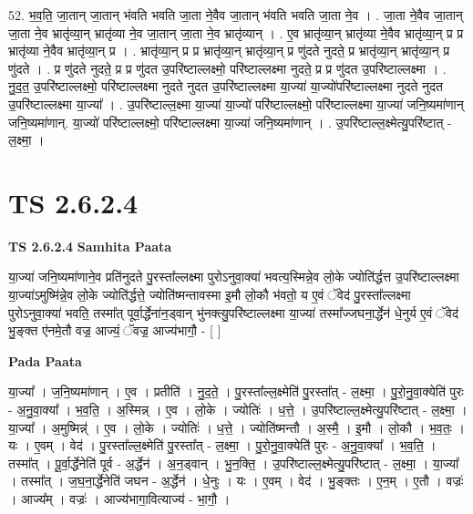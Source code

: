 \documentclass[17pt]{extarticle}
\begin{document}
52. भ॒व॒ति॒ जा॒तान् जा॒तान् भ॑वति भवति जा॒ता ने॒वैव जा॒तान् भ॑वति भवति जा॒ता ने॒व । . जा॒ता ने॒वैव जा॒तान् जा॒ता ने॒व भ्रातृ॑व्या॒न् भ्रातृ॑व्या ने॒व जा॒तान् जा॒ता ने॒व भ्रातृ॑व्यान् । . ए॒व भ्रातृ॑व्या॒न् भ्रातृ॑व्या ने॒वैव भ्रातृ॑व्या॒न् प्र प्र भ्रातृ॑व्या ने॒वैव भ्रातृ॑व्या॒न् प्र । . भ्रातृ॑व्या॒न् प्र प्र भ्रातृ॑व्या॒न् भ्रातृ॑व्या॒न् प्र णु॑दते नुदते॒ प्र भ्रातृ॑व्या॒न् भ्रातृ॑व्या॒न् प्र णु॑दते । . प्र णु॑दते नुदते॒ प्र प्र णु॑दत उ॒परि॑ष्टाल्लक्ष्मो॒ परि॑ष्टाल्लक्ष्मा नुदते॒ प्र प्र णु॑दत उ॒परि॑ष्टाल्लक्ष्मा । . नु॒द॒त॒ उ॒परि॑ष्टाल्लक्ष्मो॒ परि॑ष्टाल्लक्ष्मा नुदते नुदत उ॒परि॑ष्टाल्लक्ष्मा या॒ज्या॑ या॒ज्यो॑परि॑ष्टाल्लक्ष्मा नुदते नुदत उ॒परि॑ष्टाल्लक्ष्मा या॒ज्या᳚ । . उ॒परि॑ष्टाल्ल॒क्ष्मा या॒ज्या॑ या॒ज्यो॑ परि॑ष्टाल्लक्ष्मो॒ परि॑ष्टाल्लक्ष्मा या॒ज्या॑ जनि॒ष्यमा॑णान् जनि॒ष्यमा॑णान्. या॒ज्यो॑ परि॑ष्टाल्लक्ष्मो॒ परि॑ष्टाल्लक्ष्मा या॒ज्या॑ जनि॒ष्यमा॑णान् । . उ॒परि॑ष्टाल्ल॒क्ष्मेत्यु॒परि॑ष्टात् - ल॒क्ष्मा॒ । \newline
\pagebreak
{}
\section*{ TS 2.6.2.4 }

\textbf{TS 2.6.2.4 } \newline
\textbf{Samhita Paata} \newline

या॒ज्या॑ जनि॒ष्यमा॑णाने॒व प्रति॑नुदते पु॒रस्ता᳚ल्लक्ष्मा पुरोऽनुवा॒क्या॑ भवत्य॒स्मिन्ने॒व लो॒के ज्योति॑र्द्धत्त उ॒परि॑ष्टाल्लक्ष्मा या॒ज्या॑ऽमुष्मि॑न्ने॒व लो॒के ज्योति॑र्द्धत्ते॒ ज्योति॑ष्मन्तावस्मा इ॒मौ लो॒कौ भ॑वतो॒ य ए॒वं ॅवेद॑ पु॒रस्ता᳚ल्लक्ष्मा पुरोऽनुवा॒क्या॑ भवति॒ तस्मा᳚त् पूर्वा॒र्द्धेना॑न॒ड्वान् भु॑नक्त्यु॒परि॑ष्टाल्लक्ष्मा या॒ज्या॑ तस्मा᳚ज्जघना॒र्द्धेन॑ धे॒नुर्य ए॒वं ॅवेद॑ भु॒ङ्क्त ए॑नमे॒तौ वज्र॒ आज्यं॒ ॅवज्र॒ आज्य॑भागौ॒ - [  ] \newline

\textbf{Pada Paata} \newline

या॒ज्या᳚ । ज॒नि॒ष्यमा॑णान् । ए॒व । प्रतीति॑ । नु॒द॒ते॒ । पु॒रस्ता᳚ल्ल॒क्ष्मेति॑ पु॒रस्ता᳚त् - ल॒क्ष्मा॒ । पु॒रो॒नु॒वा॒क्येति॑ पुरः - अ॒नु॒वा॒क्या᳚ । भ॒व॒ति॒ । अ॒स्मिन्न् । ए॒व । लो॒के । ज्योतिः॑ । ध॒त्ते॒ । उ॒परि॑ष्टाल्ल॒क्ष्मेत्यु॒परि॑ष्टात् - ल॒क्ष्मा॒ । या॒ज्या᳚ । अ॒मुष्मिन्न्॑ । ए॒व । लो॒के । ज्योतिः॑ । ध॒त्ते॒ । ज्योति॑ष्मन्तौ । अ॒स्मै॒ । इ॒मौ । लो॒कौ । भ॒व॒तः॒ । यः । ए॒वम् । वेद॑ । पु॒रस्ता᳚ल्ल॒क्ष्मेति॑ पु॒रस्ता᳚त् - ल॒क्ष्मा॒ । पु॒रो॒नु॒वा॒क्येति॑ पुरः - अ॒नु॒वा॒क्या᳚ । भ॒व॒ति॒ । तस्मा᳚त् । पू॒र्वा॒र्द्धेनेति॑ पूर्व - अ॒र्द्धेन॑ । अ॒न॒ड्वान् । भु॒न॒क्ति॒ । उ॒परि॑ष्टाल्ल॒क्ष्मेत्यु॒परि॑ष्टात् - ल॒क्ष्मा॒ । या॒ज्या᳚ । तस्मा᳚त् । ज॒घ॒ना॒र्द्धेनेति॑ जघन - अ॒र्द्धेन॑ । धे॒नुः । यः । ए॒वम् । वेद॑ । भु॒ङ्क्तः । ए॒न॒म् । ए॒तौ । वज्रः॑ । आज्य᳚म् । वज्रः॑ । आज्य॑भागा॒वित्याज्य॑ - भा॒गौ॒ ।  \newline
\end{document}
